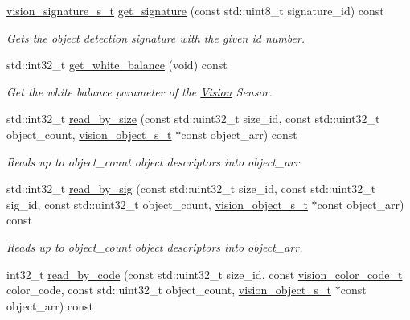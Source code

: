 \begin{DoxyCompactItemize}
\mbox{\hyperlink{vision_8h_a135c729c7277f6cc019c2924088a5fd5}{vision\+\_\+signature\+\_\+s\+\_\+t}} \mbox{\hyperlink{classpros_1_1Vision_af1d1bc18fd7dacfd23d9dfc403b7d419}{get\+\_\+signature}} (const std\+::uint8\+\_\+t signature\+\_\+id) const
\begin{DoxyCompactList}\small\item\em Gets the object detection signature with the given id number. \end{DoxyCompactList}\item 
std\+::int32\+\_\+t \mbox{\hyperlink{classpros_1_1Vision_a7a89ad6812bfd46e24e69e1dc2f55039}{get\+\_\+white\+\_\+balance}} (void) const
\begin{DoxyCompactList}\small\item\em Get the white balance parameter of the \mbox{\hyperlink{classpros_1_1Vision}{Vision}} Sensor. \end{DoxyCompactList}\item 
std\+::int32\+\_\+t \mbox{\hyperlink{classpros_1_1Vision_adb2a3e6a7c483cda5a32a341d5be0cc6}{read\+\_\+by\+\_\+size}} (const std\+::uint32\+\_\+t size\+\_\+id, const std\+::uint32\+\_\+t object\+\_\+count, \mbox{\hyperlink{vision_8h_ae619120558539c13e53b5a6f42fb4375}{vision\+\_\+object\+\_\+s\+\_\+t}} $\ast$const object\+\_\+arr) const
\begin{DoxyCompactList}\small\item\em Reads up to object\+\_\+count object descriptors into object\+\_\+arr. \end{DoxyCompactList}\item 
std\+::int32\+\_\+t \mbox{\hyperlink{classpros_1_1Vision_af5bb50d41d63d6ff9cf4f6a642046fca}{read\+\_\+by\+\_\+sig}} (const std\+::uint32\+\_\+t size\+\_\+id, const std\+::uint32\+\_\+t sig\+\_\+id, const std\+::uint32\+\_\+t object\+\_\+count, \mbox{\hyperlink{vision_8h_ae619120558539c13e53b5a6f42fb4375}{vision\+\_\+object\+\_\+s\+\_\+t}} $\ast$const object\+\_\+arr) const
\begin{DoxyCompactList}\small\item\em Reads up to object\+\_\+count object descriptors into object\+\_\+arr. \end{DoxyCompactList}\item 
int32\+\_\+t \mbox{\hyperlink{classpros_1_1Vision_afbe909146f5cf396b322467885731d04}{read\+\_\+by\+\_\+code}} (const std\+::uint32\+\_\+t size\+\_\+id, const \mbox{\hyperlink{vision_8h_a71f2011a47e95558bb534b05c16c7f2b}{vision\+\_\+color\+\_\+code\+\_\+t}} color\+\_\+code, const std\+::uint32\+\_\+t object\+\_\+count, \mbox{\hyperlink{vision_8h_ae619120558539c13e53b5a6f42fb4375}{vision\+\_\+object\+\_\+s\+\_\+t}} $\ast$const object\+\_\+arr) const

\end{DoxyCompactItemize}
